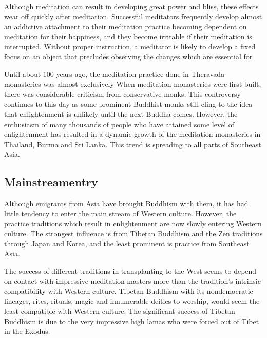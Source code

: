 \documentclass[a5paper,10pt,english]{book}
\begin{document}
\sphinxAtStartPar
Although  meditation can result in developing great power and
bliss, these effects wear off quickly after meditation. Successful
 meditators frequently develop almost an addictive attachment
to their meditation practice becoming dependent on meditation for their
happiness, and they become irritable if their meditation is interrupted.
Without proper instruction, a  meditator is likely to develop
a fixed focus on an object that precludes observing the changes which
are essential for 

\sphinxAtStartPar
Until about 100 years ago, the meditation practice done in Theravada
monasteries was almost exclusively  When 
meditation monasteries were first built, there was considerable
criticism from conservative monks. This controversy continues to this
day as some prominent Buddhist monks still cling to the idea that
enlightenment is unlikely until the next Buddha comes. However, the
enthusiasm of many thousands of people who have attained some level of
enlightenment has resulted in a dynamic growth of the meditation
monasteries in Thailand, Burma and Sri Lanka. This trend is spreading to
all parts of Southeast Asia.


\subsection{Mainstream\sphinxhyphen{}entry}
\label{\detokenize{saints:mainstream-entry}}
\sphinxAtStartPar
Although emigrants from Asia have brought Buddhism with them, it has had
little tendency to enter the main stream of Western culture. However,
the practice traditions which result in enlightenment are now slowly
entering Western culture. The strongest influence is from Tibetan
Buddhism and the Zen traditions through Japan and Korea, and the least
prominent is  practice from Southeast Asia.

\sphinxAtStartPar
The success of different traditions in transplanting to the West seems
to depend on contact with impressive meditation masters more than the
tradition’s intrinsic compatibility with Western culture. Tibetan
Buddhism with its nondemocratic lineages, rites, rituals, magic and
innumerable deities to worship, would seem the least compatible with
Western culture. The significant success of Tibetan Buddhism is due to
the very impressive high lamas who were forced out of Tibet in the
Exodus.
\end{document}
